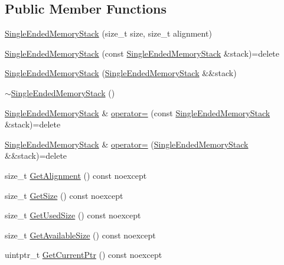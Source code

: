 \subsection*{Public Member Functions}
\begin{DoxyCompactItemize}
\item 
\hyperlink{classmage_1_1_single_ended_memory_stack_ab9555d63b35070aee321cc3839fec3c4}{Single\+Ended\+Memory\+Stack} (size\+\_\+t size, size\+\_\+t alignment)
\item 
\hyperlink{classmage_1_1_single_ended_memory_stack_ae854c4558f0215bf38cb713cbca7fa31}{Single\+Ended\+Memory\+Stack} (const \hyperlink{classmage_1_1_single_ended_memory_stack}{Single\+Ended\+Memory\+Stack} \&stack)=delete
\item 
\hyperlink{classmage_1_1_single_ended_memory_stack_a4b62040c62ede5225373c3552857e3e8}{Single\+Ended\+Memory\+Stack} (\hyperlink{classmage_1_1_single_ended_memory_stack}{Single\+Ended\+Memory\+Stack} \&\&stack)
\item 
\hyperlink{classmage_1_1_single_ended_memory_stack_adaa82d19a1ef60ca42396bdaaea0c8e6}{$\sim$\+Single\+Ended\+Memory\+Stack} ()
\item 
\hyperlink{classmage_1_1_single_ended_memory_stack}{Single\+Ended\+Memory\+Stack} \& \hyperlink{classmage_1_1_single_ended_memory_stack_a709db7d21cd2db6e98acd7985770468e}{operator=} (const \hyperlink{classmage_1_1_single_ended_memory_stack}{Single\+Ended\+Memory\+Stack} \&stack)=delete
\item 
\hyperlink{classmage_1_1_single_ended_memory_stack}{Single\+Ended\+Memory\+Stack} \& \hyperlink{classmage_1_1_single_ended_memory_stack_a24613dc91ab6577aa57fbd55a4c81023}{operator=} (\hyperlink{classmage_1_1_single_ended_memory_stack}{Single\+Ended\+Memory\+Stack} \&\&stack)=delete
\item 
size\+\_\+t \hyperlink{classmage_1_1_single_ended_memory_stack_a821660699258ecbd007c5909108a911b}{Get\+Alignment} () const noexcept
\item 
size\+\_\+t \hyperlink{classmage_1_1_single_ended_memory_stack_aa1df0adf194d6c2bb6c7597a96c10e61}{Get\+Size} () const noexcept
\item 
size\+\_\+t \hyperlink{classmage_1_1_single_ended_memory_stack_ab2b07a4cf2c9eb9988ad49174e0804ac}{Get\+Used\+Size} () const noexcept
\item 
size\+\_\+t \hyperlink{classmage_1_1_single_ended_memory_stack_a1c3f233b16e8fcb9770b7fe23b83485b}{Get\+Available\+Size} () const noexcept
\item 
uintptr\+\_\+t \hyperlink{classmage_1_1_single_ended_memory_stack_a11b792ad420eac8e620c568e89a88cef}{Get\+Current\+Ptr} () const noexcept

\end{DoxyCompactItemize}
